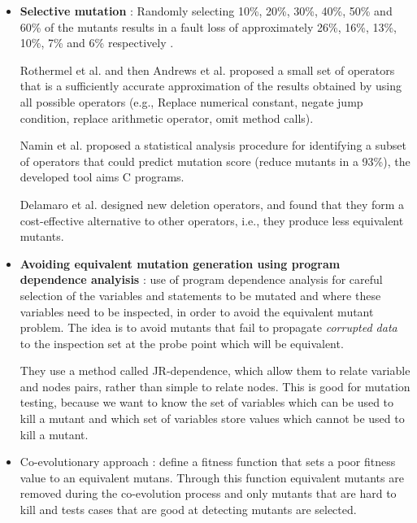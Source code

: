 \begin{itemize}
	\item \textbf{Selective mutation} \cite{mresa1999efficiency}:
	Randomly selecting 10\%, 20\%, 30\%, 40\%, 50\% and 60\% of the mutants results in a fault loss of approximately 26\%, 16\%, 13\%, 10\%, 7\% and 6\% respectively \cite{papadakis2010empirical}.

	Rothermel et al. \cite{rothermel1996experimental} and then Andrews et al. \cite{andrews2005mutation} proposed a small set of operators that is a sufficiently accurate approximation of the results obtained by using all possible operators (e.g., Replace numerical constant, negate jump condition, replace arithmetic operator, omit method calls).

	Namin et al. \cite{siami2008sufficient} proposed a statistical analysis procedure for identifying a subset of operators that could predict mutation score (reduce mutants in a 93\%), the developed tool aims C programs.

	Delamaro et al. \cite{delamaro2014designing} designed new deletion operators, and found that they form a cost-effective alternative to other operators, i.e., they produce less equivalent mutants.

	\item \textbf{Avoiding equivalent mutation generation using program dependence analyisis} \cite{harman2001relationship}: use of program dependence analysis for careful selection of the variables and statements to be mutated and where these variables need to be inspected, in order to avoid the equivalent mutant problem. The idea is to avoid mutants that fail to propagate \textit{corrupted data} to the inspection set at the probe point which will be equivalent.

	They use a method called JR-dependence, which allow them to relate variable and nodes pairs, rather than simple to relate nodes. This is good for mutation testing, because we want to know the set of variables which can be used to kill a mutant and which set of variables store values which cannot be used to kill a mutant.

	\item Co-evolutionary approach \cite{adamopoulos2004overcome}: define a fitness function that sets a poor fitness value to an equivalent mutans. Through this function equivalent mutants are removed during the co-evolution process and only mutants that are hard to kill and tests cases that are good at detecting mutants are selected.


\end{itemize}
